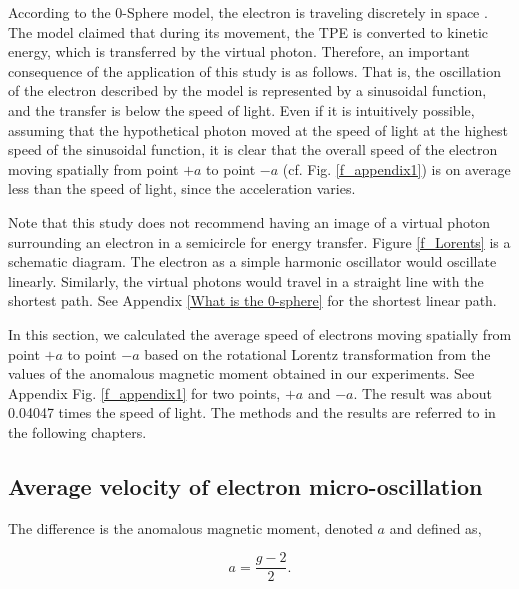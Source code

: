 \documentclass[%
 reprint,
 amsmath,amssymb,
 aps,
]{revtex4-1}
\numberwithin{equation}{section}%
\begin{document}
According to the 0-Sphere model, the electron is traveling discretely in space \cite{Hanamura2}. The model claimed that during its movement, the TPE is converted to kinetic energy, which is transferred by the virtual photon. Therefore, an important consequence of the application of this study is as follows. That is, the oscillation of the electron described by the model is represented by a sinusoidal function, and the transfer is below the speed of light. Even if it is intuitively possible, assuming that the hypothetical photon moved at the speed of light at the highest speed of the sinusoidal function, it is clear that the overall speed of the electron moving spatially from point $+a$ to point $-a$ (cf. Fig. \ref{f_appendix1}) is on average less than the speed of light, since the acceleration varies.

Note that this study does not recommend having an image of a virtual photon surrounding an electron in a semicircle for energy transfer. Figure \ref{f_Lorents} is a schematic diagram. The electron as a simple harmonic oscillator would oscillate linearly. Similarly, the virtual photons would travel in a straight line with the shortest path. See Appendix \ref{What is the 0-sphere} for the shortest linear path.

In this section, we calculated the average speed of electrons moving spatially from point $+a$ to point $-a$ based on the rotational Lorentz transformation from the values of the anomalous magnetic moment obtained in our experiments. See Appendix Fig. \ref{f_appendix1} for two points, $+a$ and $-a$. The result was about 0.04047 times the speed of light. The methods and the results are referred to in the following chapters.


\subsection{Average velocity of electron micro-oscillation}


The difference is the anomalous magnetic moment, denoted $a$ and defined as,

    \begin{equation}
        {\displaystyle a={\frac {g-2}{2}}} .
        \label{III.1}
    \end{equation}
\end{document}
